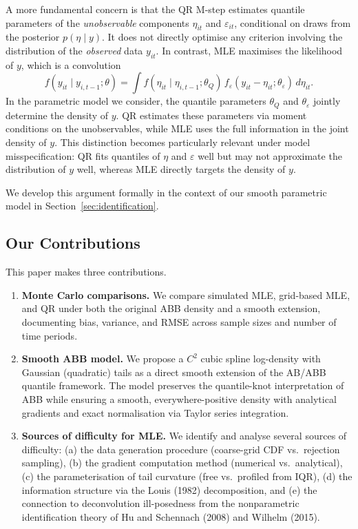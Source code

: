 \documentclass[12pt]{article}
\begin{document}
A more fundamental concern is that the QR M-step estimates quantile parameters
of the \emph{unobservable} components $\eta_{it}$ and $\varepsilon_{it}$,
conditional on draws from the posterior $p(\eta \mid y)$.
It does not directly optimise any criterion involving the distribution of the
\emph{observed} data $y_{it}$.
In contrast, MLE maximises the likelihood of $y$, which is a convolution
\begin{equation}\label{eq:conv}
f(y_{it} \mid y_{i,t-1}; \theta) = \int f(\eta_{it} \mid \eta_{i,t-1}; \theta_Q)\,
f_\varepsilon(y_{it} - \eta_{it}; \theta_\varepsilon)\, d\eta_{it}.
\end{equation}
In the parametric model we consider, the quantile parameters
$\theta_Q$ and $\theta_\varepsilon$ jointly determine the density of $y$.
QR estimates these parameters via moment conditions on the unobservables,
while MLE uses the full information in the joint density of $y$.
This distinction becomes particularly relevant under model misspecification:
QR fits quantiles of $\eta$ and $\varepsilon$ well but may not approximate
the distribution of $y$ well, whereas MLE directly targets the density of $y$.

We develop this argument formally in the context of our smooth parametric
model in Section~\ref{sec:identification}.

\subsection*{Our Contributions}

This paper makes three contributions.

\begin{enumerate}
\item \textbf{Monte Carlo comparisons.}
  We compare simulated MLE, grid-based MLE, and QR under both the original
  ABB density and a smooth extension, documenting bias, variance, and RMSE
  across sample sizes and number of time periods.

\item \textbf{Smooth ABB model.}
  We propose a $C^2$ cubic spline log-density with Gaussian (quadratic)
  tails as a direct smooth extension of the AB/ABB quantile framework.
  The model preserves the quantile-knot interpretation of ABB while
  ensuring a smooth, everywhere-positive density with analytical gradients
  and exact normalisation via Taylor series integration.

\item \textbf{Sources of difficulty for MLE.}
  We identify and analyse several sources of difficulty:
  (a) the data generation procedure (coarse-grid CDF vs.\ rejection sampling),
  (b) the gradient computation method (numerical vs.\ analytical),
  (c) the parameterisation of tail curvature (free vs.\ profiled from IQR),
  (d) the information structure via the Louis (1982) decomposition, and
  (e) the connection to deconvolution ill-posedness from the
  nonparametric identification theory of Hu and Schennach (2008) and
  Wilhelm (2015).
\end{enumerate}
\end{document}
